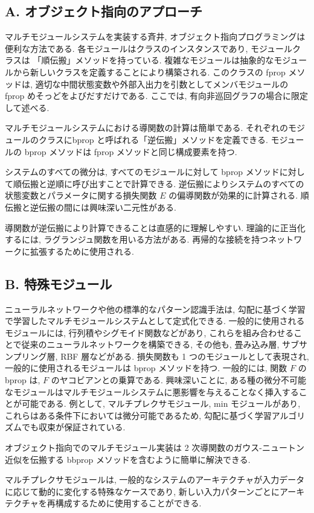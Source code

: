 \documentclass[twocolumn]{jarticle}     %
\begin{document}
\subsection*{A. オブジェクト指向のアプローチ}
マルチモジュールシステムを実装する斉井, オブジェクト指向プログラミングは便利な方法である. 各モジュールはクラスのインスタンスであり, モジュールクラスは 「順伝搬」メソッドを持っている. 複雑なモジュールは抽象的なモジュールから新しいクラスを定義することにより構築される.
このクラスの fprop メソッドは, 適切な中間状態変数や外部入出力を引数としてメンバモジュールの fprop めそっどをよびだすだけである.
ここでは, 有向非巡回グラフの場合に限定して述べる.
\par
マルチモジュールシステムにおける導関数の計算は簡単である. それぞれのモジュールのクラスにbprop と呼ばれる「逆伝搬」メソッドを定義できる. 
モジュールの bprop メソッドは fprop メソッドと同じ構成要素を持つ.

システムのすべての微分は, すべてのモジュールに対して bprop メソッドに対して順伝搬と逆順に呼び出すことで計算できる.
逆伝搬によりシステムのすべての状態変数とパラメータに関する損失関数 $E$ の偏導関数が効果的に計算される.
順伝搬と逆伝搬の間には興味深い二元性がある.
\par
導関数が逆伝搬により計算できることは直感的に理解しやすい. 理論的に正当化するには, ラグランジュ関数を用いる方法がある.
再帰的な接続を持つネットワークに拡張するために使用される.

\subsection*{B. 特殊モジュール}
ニューラルネットワークや他の標準的なパターン認識手法は, 勾配に基づく学習で学習したマルチモジュールシステムとして定式化できる.
一般的に使用されるモジュールには, 行列積やシグモイド関数などがあり, これらを組み合わせることで従来のニューラルネットワークを構築できる, その他も, 畳み込み層, サブサンプリング層, RBF 層などがある. 損失関数も 1 つのモジュールとして表現され, 一般的に使用されるモジュールは bprop メソッドを持つ. 一般的には, 関数 $F$ の bprop は, $F$ のヤコビアンとの乗算である.
 興味深いことに, ある種の微分不可能なモジュールはマルチモジュールシステムに悪影響を与えることなく挿入することが可能である.
 例として, マルチプレクサモジュール, min モジュールがあり, これらはある条件下においては微分可能であるため, 勾配に基づく学習アルゴリズムでも収束が保証されている.
\par
オブジェクト指向でのマルチモジュール実装は 2 次導関数のガウス-ニュートン近似を伝搬する bbprop メソッドを含むように簡単に解決できる.
\par
マルチプレクサモジュールは, 一般的なシステムのアーキテクチャが入力データに応じて動的に変化する特殊なケースであり, 新しい入力パターンごとにアーキテクチャを再構成するために使用することができる.
\end{document}
